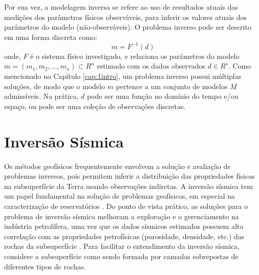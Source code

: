 Por sua vez, a modelagem inversa se refere ao uso de resultados atuais das medições dos parâmetros
físicos observáveis, para inferir os valores atuais dos parâmetros do modelo (não-observáveis).
O problema inverso pode ser descrito em uma forma discreta como:
\begin{equation}
\label{eq:deqgm}
m = F^{-1}(d)
\end{equation}
onde, $F$ é o sistema físico investigado, e relaciona os parâmetros do modelo $m=(m_1, m_2,...,m_n) \subset R^n$
estimado com os dados observados $d \in R^s$.
Como mencionado no Capítulo \ref{cap:1intro}, um problema inverso possui múltiplas soluções,
de modo que o modelo $m$ pertence a um conjunto de modelos $M$ admissíveis.
Na prática, $d$ pode ser uma função no domínio do tempo e/ou espaço, ou pode ser
uma coleção de observações discretas.

\section{Inversão Sísmica}
Os métodos geofísicos frequentemente envolvem a solução e avaliação de problemas inversos,
pois permitem inferir a distribuição das propriedades físicas na subsuperfície da Terra
usando observações indiretas. A inversão sísmica tem um papel fundamental na solução 
de problemas geofísicos, em especial na caracterização de reservatórios \citep{Bosch2010,Srivastava2009}.
Do ponto de vista prático, as soluções para o problema de inversão sísmica melhoram a exploração e
o gerenciamento na indústria petrolífera, uma vez que os dados sísmicos estimados possuem alta correlação com as
propriedades petrofísicas (porosidade, densidade, etc.) das rochas da subsuperfície \citep{leandroGRSL}.
Para facilitar o entendimento da inversão sísmica, considere a subsuperfície como sendo formada por camadas
sobrepostas de diferentes tipos de rochas.

